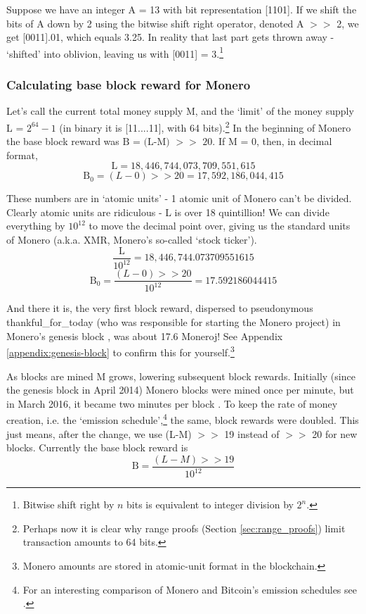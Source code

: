 Suppose we have an integer A = 13 with bit representation [1101]. If we shift the bits of A down by 2 using the bitwise shift right operator, denoted A $>>$ 2, we get [0011].01, which equals 3.25. In reality that last part gets thrown away - `shifted' into oblivion, leaving us with [0011] = 3.\footnote{Bitwise shift right by $n$ bits is equivalent to integer division by $2^n$.}

\subsubsection*{Calculating base block reward for Monero}

Let's call the current total money supply M, and the `limit' of the money supply L = $2^{64} - 1$ (in binary it is [11....11], with 64 bits).\footnote{Perhaps now it is clear why range proofs (Section \ref{sec:range_proofs}) limit transaction amounts to 64 bits.} In the beginning of Monero the base block reward was \(\textrm{B = (L-M) $>>$ 20}\). If M = 0, then, in decimal format,\vspace{.175cm}
\[\textrm{L} = 18,446,744,073,709,551,615\]
\[\textrm{B}_0 = (L-0) >> 20 = 17,592,186,044,415\]

These numbers are in `atomic units' - 1 atomic unit of Monero can't be divided. Clearly atomic units are ridiculous - L is over 18 quintillion! We can divide everything by $10^{12}$ to move the decimal point over, giving us the standard units of Monero (a.k.a. XMR, Monero's so-called `stock ticker').\vspace{.15cm}
\[\frac{\textrm{L}}{10^{12}} = 18,446,744.073709551615\]
\[\textrm{B}_0 = \frac{(L-0) >> 20}{10^{12}} = 17.592186044415\]

And there it is, the very first block reward, dispersed to pseudonymous thankful\_for\_today (who was responsible for starting the Monero project) in Monero's genesis block \cite{bitmonero-launched}, was about 17.6 Moneroj! See Appendix \ref{appendix:genesis-block} to confirm this for yourself.\footnote{Monero amounts are stored in atomic-unit format in the blockchain.}

As blocks are mined M grows, lowering subsequent block rewards. Initially (since the genesis block in April 2014) Monero blocks were mined once per minute, but in March 2016, it became two minutes per block \cite{monero-0.9.3}. To keep the rate of money creation, i.e. the `emission schedule',\footnote{For an interesting comparison of Monero and Bitcoin's emission schedules see \cite{monero-coin-emission}.} the same, block rewards were doubled. This just means, after the change, we use (L-M) $>>$ 19 instead of $>>$ 20 for new blocks. Currently the base block reward is\vspace{.175cm}
\[\textrm{B} = \frac{(L-M) >> 19}{10^{12}}\]


